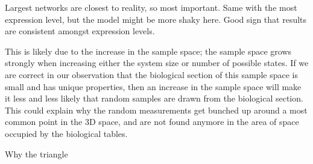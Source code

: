 \documentclass[../main.tex]{subfiles}
\begin{document}
Largest networks are closest to reality, so most important.
Same with the most expression level, but the model might be more shaky here.
Good sign that results are consistent amongst expression levels.

This is likely due to the increase in the sample space; the sample space grows strongly when increasing either the system size or number of possible states.
If we are correct in our observation that the biological section of this sample space is small and has unique properties, then an increase in the sample space will make it less and less likely that random samples are drawn from the biological section.
This could explain why the random measurements get bunched up around a most common point in the 3D space, and are not found anymore in the area of space occupied by the biological tables.

Why the triangle
\end{document}
